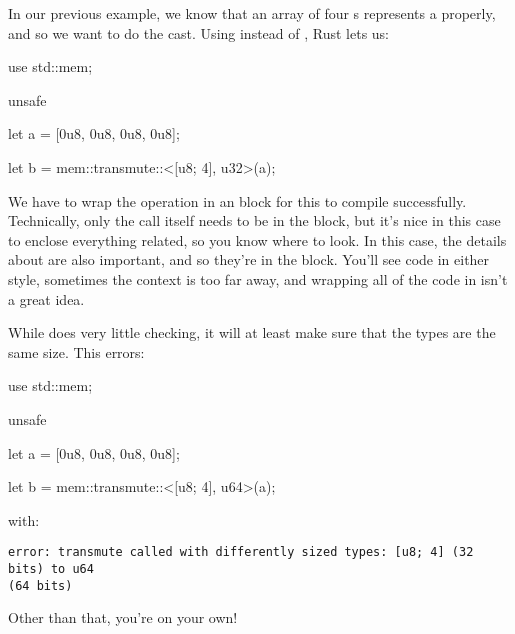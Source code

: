 \blank

In our previous example, we know that an array of four s represents a  properly, and so we want to do the cast. 
Using  instead of , Rust lets us:

\begin{rustc}
use std::mem;

unsafe {
    let a = [0u8, 0u8, 0u8, 0u8];

    let b = mem::transmute::<[u8; 4], u32>(a);
}
\end{rustc}

We have to wrap the operation in an  block for this to compile successfully. Technically, only the  call 
itself needs to be in the block, but it's nice in this case to enclose everything related, so you know where to look. In this case, the 
details about  are also important, and so they're in the block. You'll see code in either style, sometimes the context is too far away, 
and wrapping all of the code in  isn't a great idea.

\blank

While  does very little checking, it will at least make sure that the types are the same size. This errors:

\begin{rustc}
use std::mem;

unsafe {
    let a = [0u8, 0u8, 0u8, 0u8];

    let b = mem::transmute::<[u8; 4], u64>(a);
}
\end{rustc}

with:

\begin{verbatim}
error: transmute called with differently sized types: [u8; 4] (32 bits) to u64
(64 bits)
\end{verbatim}

Other than that, you're on your own!
